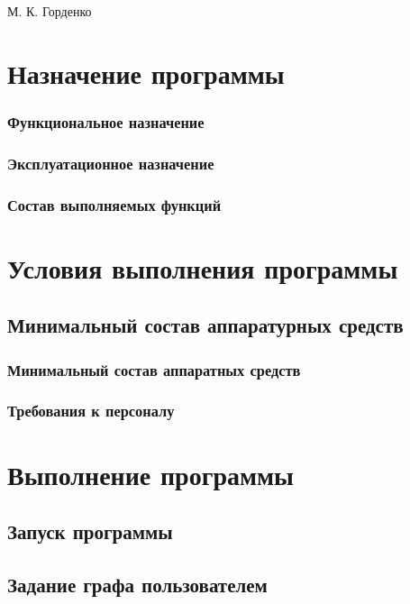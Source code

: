 \documentclass[a4paper,12pt]{article}
\begin{document}
	
	{М. К. Горденко}
	
	\firstPage
						\newpage
	\secondPage
						\newpage
	\thirdPage
						\newpage
	\section{Назначение программы}
	\subsubsection{Функциональное назначение }
	\subsubsection{Эксплуатационное назначение}
	\subsubsection{Состав выполняемых функций}
	
					\newpage
	\section{Условия выполнения программы}
	\subsection{Минимальный состав аппаратурных средств
	}
	\subsubsection{Минимальный состав аппаратных средств}
	\subsubsection{Требования к персоналу}
	
					\newpage 
	\section{Выполнение программы}
	\subsection{Запуск программы}
	\subsection{Задание графа пользователем}
\end{document}
